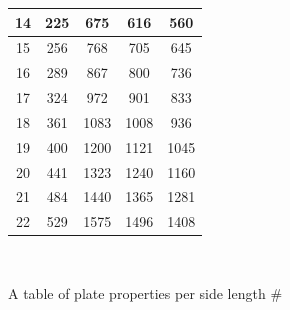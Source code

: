 \documentclass[letterpaper, 10 pt, conference]{ieeeconf}  %
\begin{document}
\begin{figure}
\begin{minipage}[b]{.45\linewidth}
\begin{tabular}{|c|c|c|c|c|}
                14                   & 225                  & 675                 & 616                 & 560                  \\ \hline
                15                   & 256                  & 768                 & 705                 & 645                  \\ \hline
                16                   & 289                  & 867                 & 800                 & 736                  \\ \hline
                17                   & 324                  & 972                 & 901                 & 833                  \\ \hline
                18                   & 361                  & 1083                & 1008                & 936                  \\ \hline
                19                   & 400                  & 1200                & 1121                & 1045                 \\ \hline
                20                   & 441                  & 1323                & 1240                & 1160                 \\ \hline
                21                   & 484                  & 1440                & 1365                & 1281                 \\ \hline
                22                   & 529                  & 1575                & 1496                & 1408                 \\ \hline
                \end{tabular}
                \caption{A table of plate properties per side length \#} \label{fig:plateproperties} 
        \end{minipage} \\



\end{figure}
\end{document}
